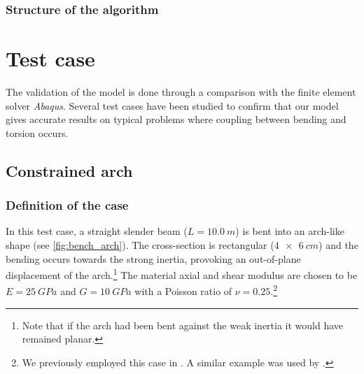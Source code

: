 \subsubsection{Structure of the algorithm}


%	

\IncMargin{2em}
\begin{figure}[p]
\begin{fullpage}
	
\end{fullpage}
\end{figure}
\DecMargin{2em}

\clearpage

\clearpage
\section{Test case}\label{sec:testcase}

The validation of the model is done through a comparison with the finite element solver \emph{Abaqus}. Several test cases have been studied to confirm that our model gives accurate results on typical problems where coupling between bending and torsion occurs.

\subsection{Constrained arch}\label{sec:testcase}

\subsubsection{Definition of the case}
In this test case, a straight slender beam ($L = \SI{10.0}{m}$) is bent into an arch-like shape (see \cref{fig:bench_arch}). The cross-section is rectangular ($\SI{4x6}{cm}$) and the bending occurs towards the strong inertia, provoking an out-of-plane displacement of the arch.\footnote{Note that if the arch had been bent against the weak inertia it would have remained planar.} The material axial and shear modulus are chosen to be $E=\SI{25}{GPa}$ and $G=\SI{10}{GPa}$ with a Poisson ratio of $\nu=0.25$.\footnote{We previously employed this case in \cite{Lefevre}. A similar example was used by .}

